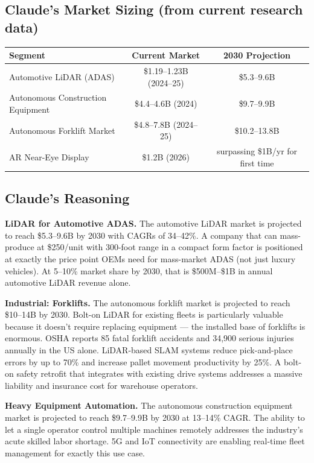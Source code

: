 \documentclass[11pt,letterpaper]{article}
\begin{document}
\subsection{Claude's Market Sizing (from current research data)}

\begin{center}
\begin{tabular}{@{}lcc@{}}
\toprule
\textbf{Segment} & \textbf{Current Market} & \textbf{2030 Projection} \\
\midrule
Automotive LiDAR (ADAS) & \$1.19--1.23B (2024--25) & \$5.3--9.6B \\
Autonomous Construction Equipment & \$4.4--4.6B (2024) & \$9.7--9.9B \\
Autonomous Forklift Market & \$4.8--7.8B (2024--25) & \$10.2--13.8B \\
AR Near-Eye Display & \$1.2B (2026) & surpassing \$1B/yr for first time \\
\bottomrule
\end{tabular}
\end{center}

\subsection{Claude's Reasoning}

\textbf{LiDAR for Automotive ADAS.}
The automotive LiDAR market is projected to reach \$5.3--9.6B by 2030 with CAGRs of 34--42\%. A company that can mass-produce at \$250/unit with 300-foot range in a compact form factor is positioned at exactly the price point OEMs need for mass-market ADAS (not just luxury vehicles). At 5--10\% market share by 2030, that is \$500M--\$1B in annual automotive LiDAR revenue alone.

\textbf{Industrial: Forklifts.}
The autonomous forklift market is projected to reach \$10--14B by 2030. Bolt-on LiDAR for existing fleets is particularly valuable because it doesn't require replacing equipment --- the installed base of forklifts is enormous. OSHA reports 85 fatal forklift accidents and 34,900 serious injuries annually in the US alone. LiDAR-based SLAM systems reduce pick-and-place errors by up to 70\% and increase pallet movement productivity by 25\%. A bolt-on safety retrofit that integrates with existing drive systems addresses a massive liability and insurance cost for warehouse operators.

\textbf{Heavy Equipment Automation.}
The autonomous construction equipment market is projected to reach \$9.7--9.9B by 2030 at 13--14\% CAGR. The ability to let a single operator control multiple machines remotely addresses the industry's acute skilled labor shortage. 5G and IoT connectivity are enabling real-time fleet management for exactly this use case.
\end{document}
